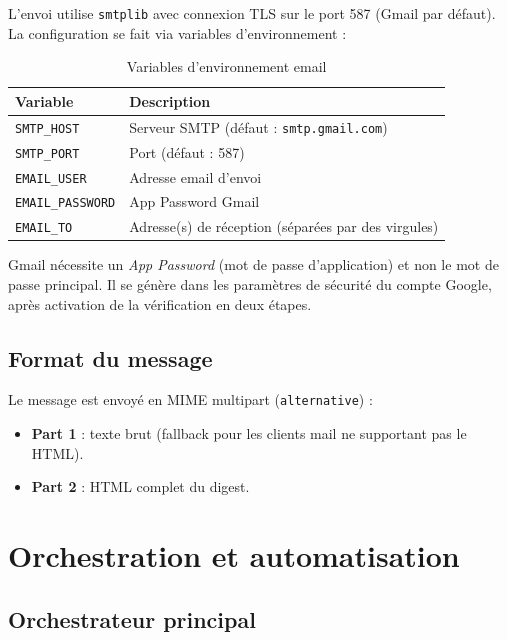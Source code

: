 \documentclass[11pt, a4paper]{article}
\begin{document}
L'envoi utilise \texttt{smtplib} avec connexion TLS sur le port 587 (Gmail par défaut). La configuration se fait via variables d'environnement :

\begin{table}[h]
\centering
\begin{tabular}{ll}
\toprule
\textbf{Variable} & \textbf{Description} \\
\midrule
\texttt{SMTP\_HOST} & Serveur SMTP (défaut : \texttt{smtp.gmail.com}) \\
\texttt{SMTP\_PORT} & Port (défaut : 587) \\
\texttt{EMAIL\_USER} & Adresse email d'envoi \\
\texttt{EMAIL\_PASSWORD} & App Password Gmail \\
\texttt{EMAIL\_TO} & Adresse(s) de réception (séparées par des virgules) \\
\bottomrule
\end{tabular}
\caption{Variables d'environnement email}
\end{table}

\begin{warnbox}
Gmail nécessite un \textit{App Password} (mot de passe d'application) et non le mot de passe principal. Il se génère dans les paramètres de sécurité du compte Google, après activation de la vérification en deux étapes.
\end{warnbox}

\subsection{Format du message}

Le message est envoyé en MIME multipart (\texttt{alternative}) :
\begin{itemize}
    \item \textbf{Part 1} : texte brut (fallback pour les clients mail ne supportant pas le HTML).
    \item \textbf{Part 2} : HTML complet du digest.
\end{itemize}

\section{Orchestration et automatisation}

\subsection{Orchestrateur principal}
\end{document}
